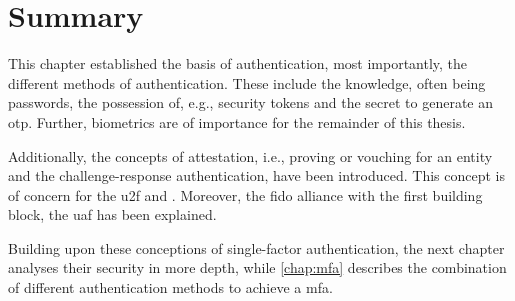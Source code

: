 \newpage
\section{Summary}

This chapter established the basis of authentication, most importantly, the different methods of authentication. These include the knowledge, often being passwords, the possession of, e.g., security tokens and the secret to generate an \gls{otp}. Further, biometrics are of importance for the remainder of this thesis.

Additionally, the concepts of attestation, i.e., proving or vouching for an entity and the challenge-response authentication, have been introduced. This concept is of concern for the \gls{u2f} and \wa. Moreover, the \gls{fido} alliance with the first building block, the \gls{uaf} has been explained.

Building upon these conceptions of single-factor authentication, the next chapter analyses their security in more depth, while \autoref{chap:mfa} describes the combination of different authentication methods to achieve a \gls{mfa}.